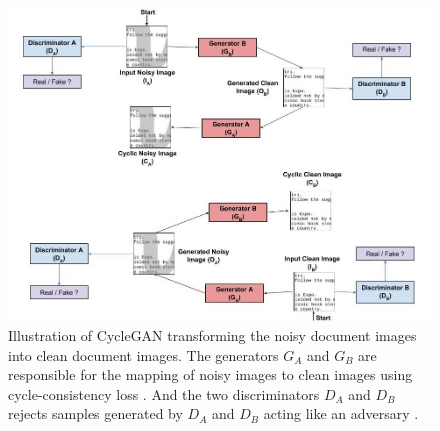 \begin{figure}[H]
        \begin{center}
 	    \includegraphics[scale=0.60]{images/relatedWorks/LearningToClean.jpg}
	    \caption[Illustration of \ac{CycleGAN} transforming the noisy document images into clean document images. and vice versa.]{Illustration of CycleGAN transforming the noisy document images into clean document images. The generators $G_A$ and $G_B$ are responsible for the mapping of noisy images to clean images using cycle-consistency loss \cite{zhu2020unpaired}. And the two discriminators $D_A$ and $D_B$ rejects samples generated by $D_A$ and $D_B$ acting like an adversary \cite{sharma2019learning}.}
	    \label{fig:LearningToClean}
	    \end{center}
\end{figure}



